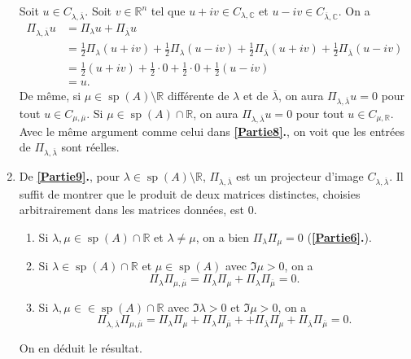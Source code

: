 \documentclass[french]{article}
\theoremstyle{definition}
\newcommand{\ol}[1]{\overline{#1}}
\newcommand{\Cbb}{\mathbb{C}}
\newcommand{\Rbb}{\mathbb{R}}
\newcommand{\spec}{\operatorname{sp}}
\begin{document}
\begin{enumerate}
    Soit $u \in C_{\lambda,\ol{\lambda}}$. Soit $v \in \Rbb^n$ tel que $u + iv \in C_{\lambda,\Cbb}$ et $u - iv \in C_{\ol{\lambda},\Cbb}$. On a
        \begin{align*}
         \Pi_{\lambda,\ol{\lambda}} u & = \Pi_\lambda u + \Pi_{\ol{\lambda}} u \\
          & = \frac{1}{2}\Pi_\lambda(u + iv) + \frac{1}{2}\Pi_\lambda(u - iv) + \frac{1}{2}\Pi_{\ol{\lambda}}(u + iv) + \frac{1}{2}\Pi_{\ol{\lambda}}(u - iv)\\
          & = \frac{1}{2}(u + iv) + \frac{1}{2} \cdot 0 + \frac{1}{2} \cdot 0 + \frac{1}{2}( u -iv) \\
          & = u.
        \end{align*}
    De m\^eme, si $\mu \in \spec(A) \setminus \Rbb$ diff\'erente de $\lambda$ et de $\ol{\lambda}$, on aura $\Pi_{\lambda,\ol{\lambda}} u = 0$ pour tout $u \in C_{\mu,\ol{\mu}}$. Si $\mu \in \spec(A) \cap \Rbb$, on aura $\Pi_{\lambda,\ol{\lambda}} u = 0$ pour tout $u \in C_{\mu,\Rbb}$. Avec le m\^eme argument comme celui dans {\bf \ref{Partie8}.}, on voit que les entr\'ees de $\Pi_{\lambda,\ol{\lambda}}$ sont r\'eelles.
    
    \item \label{Partie10} De {\bf \ref{Partie9}.}, pour $\lambda \in \spec(A) \setminus \Rbb$, $\Pi_{\lambda,\ol{\lambda}}$ est un projecteur d'image $C_{\lambda,\ol{\lambda}}$. Il suffit de montrer que le produit de deux matrices distinctes, choisies arbitrairement dans les matrices donn\'ees, est $0$.
    \begin{enumerate} 
        \item Si $\lambda,\mu \in \spec(A) \cap \Rbb$ et $\lambda \neq \mu$, on a bien $\Pi_\lambda \Pi_\mu = 0$ ({\bf \ref{Partie6}.}).
        
        \item  Si $\lambda \in \spec(A) \cap \Rbb$ et $\mu \in \spec(A)$ avec $\Im \mu > 0$, on a
            $$\Pi_\lambda \Pi_{\mu,\ol{\mu}} = \Pi_\lambda \Pi_\mu + \Pi_\lambda \Pi_{\ol{\mu}} = 0.$$
            
        \item Si $\lambda,\mu \in \in \spec(A) \cap \Rbb$ avec $\Im \lambda > 0$ et $\Im \mu > 0$, on a
            $$\Pi_{\lambda,\ol{\lambda}} \Pi_{\mu,\ol{\mu}} = \Pi_\lambda \Pi_\mu + \Pi_\lambda \Pi_{\ol{\mu}} + + \Pi_{\ol{\lambda}}\Pi_\mu +  \Pi_{\ol{\lambda}} \Pi_{\ol{\mu}} = 0.$$
    \end{enumerate}
    On en d\'eduit le r\'esultat.
\end{enumerate}
\end{document}
